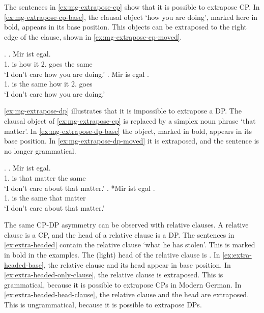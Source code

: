 The sentences in \ref{ex:mg-extrapose-cp} show that it is possible to extrapose CP. In \ref{ex:mg-extrapose-cp-base}, the clausal object  `how you are doing', marked here in bold, appears in its base position. This objects can be extraposed to the right edge of the clause, shown in \ref{ex:mg-extrapose-cp-moved}.

\ex.\label{ex:mg-extrapose-cp}
\ag. Mir ist     egal.\\
 1. is how it 2. goes {the same}\\
 `I don't care how you are doing.' \label{ex:mg-extrapose-cp-base}
\bg. Mir is egal    .\\
 1. is {the same} how it 2. goes\\
 `I don't care how you are doing.' \label{ex:mg-extrapose-cp-moved}

\ref{ex:mg-extrapose-dp} illustrates that it is impossible to extrapose a DP. The clausal object of \ref{ex:mg-extrapose-cp} is replaced by a simplex noun phrase  `that matter'.
In \ref{ex:mg-extrapose-dp-base} the object, marked in bold, appears in its base position. In \ref{ex:mg-extrapose-dp-moved} it is extraposed, and the sentence is no longer grammatical.

\ex.\label{ex:mg-extrapose-dp}
\ag. Mir ist   egal.\\
 1. is that matter {the same}\\
 `I don't care about that matter.' \label{ex:mg-extrapose-dp-base}
\bg. *Mir ist egal  .\\
 1. is {the same} that matter\\
 `I don't care about that matter.' \label{ex:mg-extrapose-dp-moved}

The same CP-DP asymmetry can be observed with relative clauses. A relative clause is a CP, and the head of a relative clause is a DP. The sentences in \ref{ex:extra-headed} contain the relative clause  `what he has stolen'. This is marked in bold in the examples. The (light) head of the relative clause is .
In \ref{ex:extra-headed-base}, the relative clause and its head appear in base position. In \ref{ex:extra-headed-only-clause}, the relative clause is extraposed. This is grammatical, because it is possible to extrapose CPs in Modern German. In \ref{ex:extra-headed-head-clause}, the relative clause and the head are extraposed. This is ungrammatical, because it is possible to extrapose DPs.

